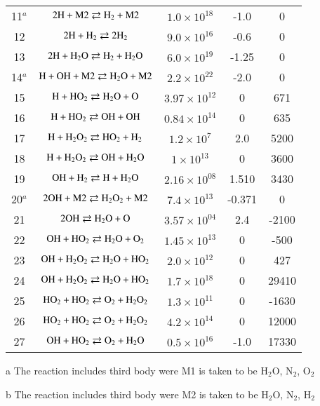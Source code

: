 \documentclass{warpdoc}
\begin{document}
\begin{table}[t]
\begin{center}
\begin{threeparttable}
\begin{tabular}{ccccc}
    11$^a$ & $\rm 2H + M2 \rightleftarrows  H_2 + M2$  & $ 1.0 \times 10^{18} $& -1.0 & 0 \\
    12 & $\rm 2H + H_2 \rightleftarrows  2H_2 $  & $ 9.0 \times 10^{16} $& -0.6 & 0 \\
    13 & $\rm 2H + H_2O \rightleftarrows  H_2 + H_2O$  & $ 6.0 \times 10^{19} $& -1.25 & 0 \\
    14$^a$ & $\rm H + OH + M2 \rightleftarrows  H_2O + M2$  & $ 2.2 \times 10^{22} $& -2.0 & 0 \\
    15 & $\rm H + HO_2 \rightleftarrows  H_2O + O$  & $ 3.97 \times 10^{12} $& 0 & 671 \\
    16 & $\rm H + HO_2 \rightleftarrows  OH + OH$  & $ 0.84 \times 10^{14} $& 0 & 635 \\
    17 & $\rm H + H_2O_2 \rightleftarrows  HO_2 + H_2$  & $ 1.2 \times 10^{7} $& 2.0 & 5200 \\
    18 & $\rm H + H_2O_2 \rightleftarrows  OH + H_2O$  & $ 1 \times 10^{13} $& 0 & 3600 \\
    19 & $\rm OH + H_2 \rightleftarrows  H + H_2O$  & $ 2.16 \times 10^{08} $& 1.510 & 3430 \\
    20$^a$ & $\rm 2OH + M2 \rightleftarrows  H_2O_2 + M2$  & $ 7.4 \times 10^{13} $& -0.371 & 0 \\
    21 & $\rm 2OH \rightleftarrows  H_2O + O$  & $ 3.57 \times 10^{04} $& 2.4 & -2100 \\
    22 & $\rm OH + HO_2 \rightleftarrows  H_2O + O_2$  & $ 1.45 \times 10^{13} $& 0 & -500 \\
    23 & $\rm OH + H_2O_2 \rightleftarrows  H_2O + HO_2$  & $ 2.0 \times 10^{12} $& 0 & 427 \\
    24 & $\rm OH + H_2O_2 \rightleftarrows  H_2O + HO_2$  & $ 1.7 \times 10^{18} $& 0 & 29410  \\
    25 & $\rm HO_2 + HO_2 \rightleftarrows  O_2 + H_2O_2$  & $ 1.3 \times 10^{11} $& 0 & -1630  \\
    26 & $\rm HO_2 + HO_2 \rightleftarrows  O_2 + H_2O_2$  & $ 4.2 \times 10^{14} $& 0 & 12000  \\
    27 & $\rm OH + HO_2 \rightleftarrows  O_2 + H_2O$  & $ 0.5 \times 10^{16} $& -1.0 & 17330  \\
\bottomrule
\end{tabular}
\label{tab:smith-reaction}
\begin{tablenotes}
\item[{a}] The reaction includes third body were M1 is taken to be H$_2$O, N$_2$, O$_2$
\item[{b}] The reaction includes third body were M2 is taken to be H$_2$O, N$_2$, H$_2$\\
\end{tablenotes}
\end{threeparttable}
\end{center}
\end{table}
%














\end{document}
